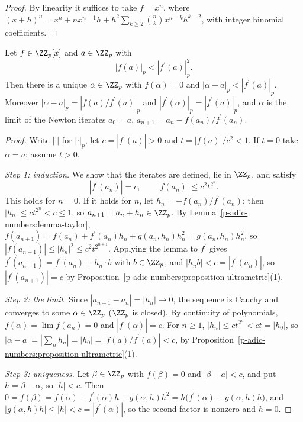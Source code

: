\begin{proof}
By linearity it suffices to take $f = x^n$, where $(x + h)^n = x^n + nx^{n-1}h + h^2\sum_{k \geq 2}\binom nkx^{n-k}h^{k-2}$, with integer binomial coefficients.
\end{proof}

\begin{theorem}\label{p-adic-numbers:theorem-hensel}
Let $f \in \ZZ_p[x]$ and $a \in \ZZ_p$ with
\[
|f(a)|_p < |f^{\prime}(a)|_p^2 .
\]
Then there is a unique $\alpha \in \ZZ_p$ with $f(\alpha) = 0$ and $|\alpha - a|_p < |f^{\prime}(a)|_p$. Moreover $|\alpha - a|_p = |f(a)/f^{\prime}(a)|_p$ and $|f^{\prime}(\alpha)|_p = |f^{\prime}(a)|_p$, and $\alpha$
is the limit of the Newton iterates $a_0 = a$, $a_{n+1} = a_n - f(a_n)/f^{\prime}(a_n)$.
\end{theorem}

\begin{proof}
Write $|\cdot|$ for $|\cdot|_p$, let $c = |f^{\prime}(a)| > 0$ and $t = |f(a)|/c^2 < 1$. If $t = 0$ take $\alpha = a$; assume $t > 0$.

\emph{Step 1: induction.} We show that the iterates are defined, lie in $\ZZ_p$, and satisfy
\[
|f^{\prime}(a_n)| = c, \qquad |f(a_n)| \leq c^2t^{2^n} .
\]
This holds for $n = 0$. If it holds for $n$, let $h_n = -f(a_n)/f^{\prime}(a_n)$; then $|h_n| \leq ct^{2^n} < c \leq 1$, so $a_{n+1} = a_n + h_n \in \ZZ_p$. By Lemma~\ref{p-adic-numbers:lemma-taylor},
$f(a_{n+1}) = f(a_n) + f^{\prime}(a_n)h_n + g(a_n, h_n)h_n^2 = g(a_n, h_n)h_n^2$, so $|f(a_{n+1})| \leq |h_n|^2 \leq c^2t^{2^{n+1}}$. Applying the lemma to $f^{\prime}$ gives
$f^{\prime}(a_{n+1}) = f^{\prime}(a_n) + h_n\cdot b$ with $b \in \ZZ_p$, and $|h_nb| < c = |f^{\prime}(a_n)|$, so $|f^{\prime}(a_{n+1})| = c$ by Proposition~\ref{p-adic-numbers:proposition-ultrametric}(1).

\emph{Step 2: the limit.} Since $|a_{n+1} - a_n| = |h_n| \to 0$, the sequence is Cauchy and converges to some $\alpha \in \ZZ_p$ ($\ZZ_p$ is closed). By continuity of polynomials, $f(\alpha) = \lim f(a_n) = 0$
and $|f^{\prime}(\alpha)| = c$. For $n \geq 1$, $|h_n| \leq ct^{2^n} < ct = |h_0|$, so $|\alpha - a| = |\sum_nh_n| = |h_0| = |f(a)/f^{\prime}(a)| < c$, by Proposition~\ref{p-adic-numbers:proposition-ultrametric}(1).

\emph{Step 3: uniqueness.} Let $\beta \in \ZZ_p$ with $f(\beta) = 0$ and $|\beta - a| < c$, and put $h = \beta - \alpha$, so $|h| < c$. Then
$0 = f(\beta) = f(\alpha) + f^{\prime}(\alpha)h + g(\alpha, h)h^2 = h\bigl(f^{\prime}(\alpha) + g(\alpha, h)h\bigr)$, and $|g(\alpha, h)h| \leq |h| < c = |f^{\prime}(\alpha)|$, so the second factor is nonzero and $h = 0$.
\end{proof}

